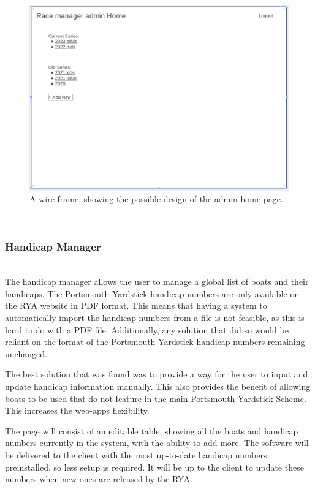 \documentclass{l4proj}
\begin{document}
\begin{figure}[H]
    \centering
    \includegraphics[width=1\linewidth]{images/admin home 2.png} 

    \caption{A wire-frame, showing the possible design of the admin home page.
    }

    \label{fig:adminHomeWF}
\end{figure}

\hfill\\
\subsubsection{Handicap Manager}
\hfill\\
The handicap manager allows the user to manage a global list of boats and their handicaps. The Portsmouth Yardstick handicap numbers are only available on the RYA website in PDF format. This means that having a system to automatically import the handicap numbers from a file is not feasible, as this is hard to do with a PDF file. Additionally, any solution that did so would be reliant on the format of the Portsmouth Yardstick handicap numbers remaining unchanged.

The best solution that was found was to provide a way for the user to input and update handicap information manually. This also provides the benefit of allowing boats to be used that do not feature in the main Portsmouth Yardstick Scheme. This increases the web-apps flexibility.

The page will consist of an editable table, showing all the boats and handicap numbers currently in the system, with the ability to add more. The software will be delivered to the client with the most up-to-date handicap numbers preinstalled, so less setup is required. It will be up to the client to update these numbers when new ones are released by the RYA.
\end{document}
